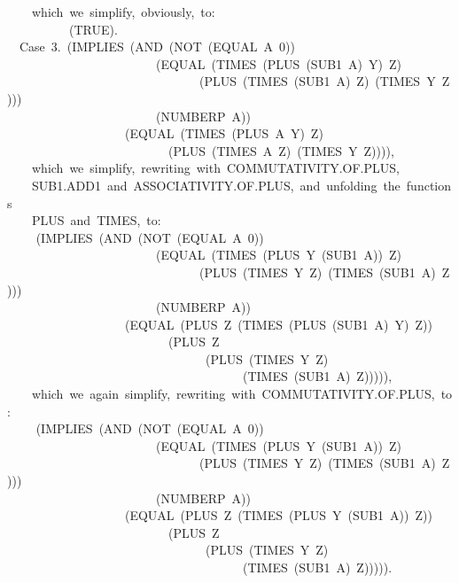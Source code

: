 \documentclass[10pt]{book}
\newenvironment{pubasis}{\begin{flushleft}}{\end{flushleft}}
\begin{document}
\begin{pubasis}
~~~~which~we~simplify,~obviously,~to:\\

~~~~~~~~~~(TRUE).\\

~~Case~3.~(IMPLIES~(AND~(NOT~(EQUAL~A~0))\\
~~~~~~~~~~~~~~~~~~~~~~~~(EQUAL~(TIMES~(PLUS~(SUB1~A)~Y)~Z)\\
~~~~~~~~~~~~~~~~~~~~~~~~~~~~~~~(PLUS~(TIMES~(SUB1~A)~Z)~(TIMES~Y~Z)))\\
~~~~~~~~~~~~~~~~~~~~~~~~(NUMBERP~A))\\
~~~~~~~~~~~~~~~~~~~(EQUAL~(TIMES~(PLUS~A~Y)~Z)\\
~~~~~~~~~~~~~~~~~~~~~~~~~~(PLUS~(TIMES~A~Z)~(TIMES~Y~Z)))),\\

~~~~which~we~simplify,~rewriting~with~COMMUTATIVITY.OF.PLUS,\\
~~~~SUB1.ADD1~and~ASSOCIATIVITY.OF.PLUS,~and~unfolding~the~functions\\
~~~~PLUS~and~TIMES,~to:\\

~~	~~(IMPLIES~(AND~(NOT~(EQUAL~A~0))\\
~~~~~~~~~~~~~~~~~~~~~~~~(EQUAL~(TIMES~(PLUS~Y~(SUB1~A))~Z)\\
~~~~~~~~~~~~~~~~~~~~~~~~~~~~~~~(PLUS~(TIMES~Y~Z)~(TIMES~(SUB1~A)~Z)))\\
~~~~~~~~~~~~~~~~~~~~~~~~(NUMBERP~A))\\
~~~~~~~~~~~~~~~~~~~(EQUAL~(PLUS~Z~(TIMES~(PLUS~(SUB1~A)~Y)~Z))\\
~~~~~~~~~~~~~~~~~~~~~~~~~~(PLUS~Z\\
~~~~~~~~~~~~~~~~~~~~~~~~~~~~~~~~(PLUS~(TIMES~Y~Z)\\
~~~~~~~~~~~~~~~~~~~~~~~~~~~~~~~~~~~~~~(TIMES~(SUB1~A)~Z))))),\\

~~~~which~we~again~simplify,~rewriting~with~COMMUTATIVITY.OF.PLUS,~to:\\

~~	~~(IMPLIES~(AND~(NOT~(EQUAL~A~0))\\
~~~~~~~~~~~~~~~~~~~~~~~~(EQUAL~(TIMES~(PLUS~Y~(SUB1~A))~Z)\\
~~~~~~~~~~~~~~~~~~~~~~~~~~~~~~~(PLUS~(TIMES~Y~Z)~(TIMES~(SUB1~A)~Z)))\\
~~~~~~~~~~~~~~~~~~~~~~~~(NUMBERP~A))\\
~~~~~~~~~~~~~~~~~~~(EQUAL~(PLUS~Z~(TIMES~(PLUS~Y~(SUB1~A))~Z))\\
~~~~~~~~~~~~~~~~~~~~~~~~~~(PLUS~Z\\
~~~~~~~~~~~~~~~~~~~~~~~~~~~~~~~~(PLUS~(TIMES~Y~Z)\\
~~~~~~~~~~~~~~~~~~~~~~~~~~~~~~~~~~~~~~(TIMES~(SUB1~A)~Z))))).\\


\end{pubasis}
\end{document}
